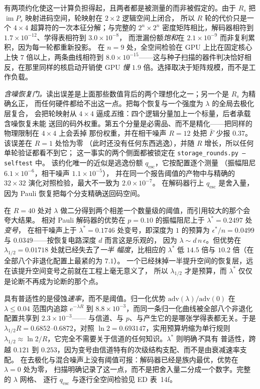 \documentclass[11pt,a4paper]{article}
\begin{document}
有两项约化使这一计算负担得起，且两者都是被测量的而非被假定的。由于 $R_s$ 把
$\operatorname{im}P_s$ 映射进码空间，轮映射在 $2\times2$ 逻辑空间上闭合，
所以 $R$ 轮的代价只是一个 $4\times4$ 超算符的一次本征分解；与完整的
$2^n\times2^n$ 密度矩阵相比，解码器相符到 $1.7\times10^{-12}$、学得表相符到 $3.0\times10^{-8}$，
而泄漏份额\emph{饱和}在 $2.1\times10^{-9}$ 而非复利累积，因为每一轮都重新投影。
在 $n=9$ 处，全空间检验在 GPU 上比在固定核心上快 $7$ 倍以上，两条曲线相符到
$8.0\times10^{-15}$——这与种子扫描的器件判决恰好相反，在那里同样的核启动开销使 GPU
\emph{慢} $1.9$ 倍。选择取决于矩阵规模，而不是工作负载。

\emph{含噪恢复门。}读出误差是上面那些数值背后的两个理想化之一；另一个是 $R_s$ 为精确幺正，
而任何硬件都给不出这一点。把每个恢复与一个强度为 $\lambda$ 的全局去极化层复合，
会把轮映射从 $4\times4$ 逼成\emph{五}维：四个逻辑分量加上一个标量，后者承载含噪恢复未能
送回的码外权重。第五个分量是必需品、而不是精化——把同样的物理限制在 $4\times4$ 上会丢掉
那份权重，并在相干噪声 $R=12$ 处把 $\bar F$ 少报 $0.37$。该误差在 $R=1$ 处恰为零
（此时还没有任何东西逃逸），并随 $R$ 增长，所以任何单轮验证都看不到它；
这一事实的两个侧面都被锁定在 \texttt{storage\_rounds.py --selftest} 中。
该约化唯一的近似是逃逸份额 $q_\mathrm{esc}$，它按配置逐个测量
（振幅阻尼 $6.1\times10^{-6}$，相干噪声 $1.1\times10^{-5}$），
并在同一个报告阈值的产物中与精确的 $32\times32$ 演化对照检验，最大不一致为 $2.0\times10^{-7}$。
在解码器行上 $q_\mathrm{esc}$ 是舍入量，因为 Pauli 恢复把每个分支精确送回码空间。

在 $R=40$ 处对 $\lambda$ 做二分得到两个相差一个数量级的阈值，而引用较大的那个会夸大结果。
相对 Pauli 解码器的优势在 $p=0.10$ 的振幅阻尼上于 $\lambda^*=0.2497$ 处\emph{变号}，
在相干噪声上于 $\lambda^*=0.1746$ 处变号，即深度为 $1$ 的预算为
$\epsilon^*/n=0.0499$ 与 $0.0349$——按恢复电路深度 $d$ 而言这是乐观的，
因为 $\lambda\sim d\,n\,\epsilon$。但优势在 $\lambda_{1/2}=0.01718$ 处就已经失去了\emph{一半
幅度}，比相应的 $\lambda^*$ 低 $14.5$ 倍与 $10.2$ 倍（在全部八个非退化配置上最紧的为 $7.1$）。
一个已经抹掉一半提升空间的恢复层，远在该提升空间变号之前就在工程上毫无意义了，
所以 $\lambda_{1/2}$ 才是预算，而 $\lambda^*$ 仅仅是论断不再成为论断的那个点。

具有普适性的是侵蚀\emph{速率}，而不是阈值。归一化优势
$\mathrm{adv}(\lambda)/\mathrm{adv}(0)$ 在 $\lambda\le0.04$ 范围内追踪 $e^{-\lambda R}$
到 $8.8\times10^{-3}$，而同一条归一化曲线被全部八个非退化配置共享到 $2.3\times10^{-3}$——
与信道、与 $p$、与产生它的是哪张学得表都无关。于是
$\lambda_{1/2}R=0.6852$--$0.6872$，对照 $\ln2=0.693147$，实用预算坍缩为单行规则
$\lambda_{1/2}\approx\ln2/R$，它完全不需要关于信道的任何知识。$\lambda^*$ 则明确\emph{不}具有
普适性，跨越 $0.121$ 到 $0.253$，因为变号由信道特有的次级结构支配、而不是由衰减速率支配。
在去极化与混合噪声上没有阈值可报：解码器已经是族内最优，优势在 $\lambda=0$ 处为零，
扫描明确记录了这一点，而不是把舍入量二分成一个数字。完整的 $\lambda$ 网格、
逐行 $q_\mathrm{esc}$ 与逐行全空间检验见 ED 表~14f。
\end{document}
